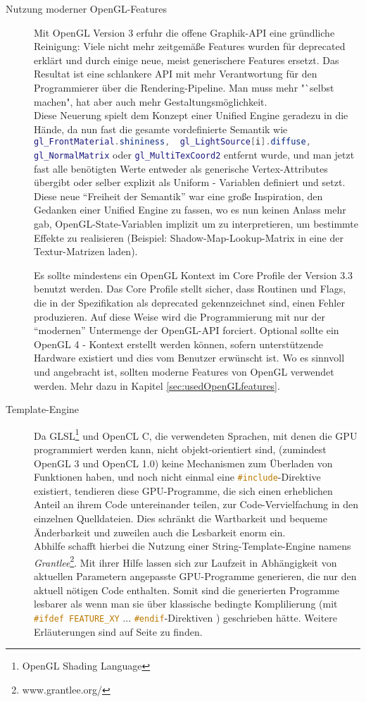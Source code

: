 \begin{description}
	\item[Nutzung moderner OpenGL-Features]
	Mit OpenGL Version 3 erfuhr die offene Graphik-API eine gründliche Reinigung: Viele nicht mehr zeitgemäße Features 
	wurden für deprecated erklärt und durch einige neue, meist generischere Features ersetzt.
	Das Resultat ist eine schlankere API mit mehr Verantwortung für den Programmierer über die Rendering-Pipeline.
	Man muss mehr "`selbst machen", hat aber auch mehr Gestaltungsmöglichkeit.\\
	Diese Neuerung spielt dem Konzept einer Unified Engine geradezu in die Hände, da nun fast die gesamte vordefinierte 
	Semantik wie 
	\lstinline[language=GLSL]|gl_FrontMaterial.shininess,  gl_LightSource[i].diffuse, gl_NormalMatrix| oder 
	\lstinline[language=GLSL]|gl_MultiTexCoord2|
 	entfernt wurde, und man jetzt fast alle benötigten Werte entweder als generische Vertex-Attributes übergibt oder 
 	selber explizit als Uniform - Variablen definiert und setzt. Diese neue "`Freiheit der Semantik"' war eine große 
 	Inspiration, den Gedanken einer Unified Engine zu fassen, wo es nun keinen Anlass mehr gab, OpenGL-State-Variablen 
 	implizit um zu interpretieren, um bestimmte Effekte zu realisieren (Beispiel: Shadow-Map-Lookup-Matrix in eine der 	
 	Textur-Matrizen laden).
	
	Es sollte mindestens ein OpenGL Kontext im Core Profile der Version 3.3 benutzt werden. Das Core Profile stellt sicher,
	dass Routinen und Flags, die in der Spezifikation als deprecated gekennzeichnet sind, einen Fehler produzieren.
	Auf diese Weise wird die Programmierung mit nur der "`modernen"' Untermenge der OpenGL-API forciert.
	Optional sollte ein OpenGL 4 - Kontext erstellt werden können, sofern unterstützende Hardware existiert und dies vom 
	Benutzer erwünscht ist.
	Wo es sinnvoll und angebracht ist, sollten moderne Features von OpenGL verwendet werden.
	Mehr dazu in Kapitel \ref{sec:usedOpenGLfeatures}.

	
	\item[Template-Engine]
	Da GLSL\footnote{OpenGL Shading Language} und OpenCL C, die verwendeten Sprachen, 
	mit denen die GPU programmiert werden kann, nicht objekt-orientiert sind, 
	(zumindest OpenGL 3 und OpenCL 1.0) keine Mechanismen zum Überladen von Funktionen 
	haben, und noch nicht einmal eine \lstinline[language=C]|#include|-Direktive existiert,
	tendieren diese GPU-Programme, die sich einen erheblichen Anteil an ihrem Code untereinander teilen, 
	zur Code-Vervielfachung in den einzelnen Quelldateien.
	Dies schränkt die Wartbarkeit und bequeme Änderbarkeit und zuweilen auch die Lesbarkeit enorm ein.\\
	Abhilfe schafft hierbei die Nutzung einer String-Template-Engine namens \emph{Grantlee}\footnote{www.grantlee.org/}.
	Mit ihrer Hilfe lassen sich zur Laufzeit in Abhängigkeit von aktuellen Parametern angepasste GPU-Programme generieren,
	die nur den aktuell nötigen Code enthalten.
	Somit sind die generierten Programme lesbarer als wenn man sie über klassische bedingte Komplilierung 
	(mit \lstinline[language=C]|#ifdef FEATURE_XY| ... \lstinline[language=C]|#endif|-Direktiven ) geschrieben hätte.
	Weitere Erläuterungen sind auf Seite \pageref{sec:archtitectured:dependencies:Grentlee} zu finden.


\end{description}
